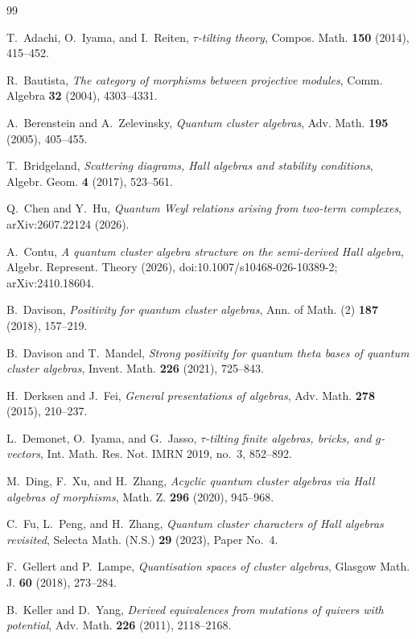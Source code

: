 \begin{thebibliography}{99}

T.~Adachi, O.~Iyama, and I.~Reiten,
\emph{$\tau$-tilting theory},
Compos. Math. \textbf{150} (2014), 415--452.

R.~Bautista,
\emph{The category of morphisms between projective modules},
Comm. Algebra \textbf{32} (2004), 4303--4331.

A.~Berenstein and A.~Zelevinsky,
\emph{Quantum cluster algebras},
Adv. Math. \textbf{195} (2005), 405--455.

T.~Bridgeland,
\emph{Scattering diagrams, Hall algebras and stability conditions},
Algebr. Geom. \textbf{4} (2017), 523--561.

Q.~Chen and Y.~Hu,
\emph{Quantum Weyl relations arising from two-term complexes},
arXiv:2607.22124 (2026).

A.~Contu,
\emph{A quantum cluster algebra structure on the semi-derived Hall algebra},
Algebr. Represent. Theory (2026),
doi:10.1007/s10468-026-10389-2; arXiv:2410.18604.

B.~Davison,
\emph{Positivity for quantum cluster algebras},
Ann. of Math. (2) \textbf{187} (2018), 157--219.

B.~Davison and T.~Mandel,
\emph{Strong positivity for quantum theta bases of quantum cluster algebras},
Invent. Math. \textbf{226} (2021), 725--843.

H.~Derksen and J.~Fei,
\emph{General presentations of algebras},
Adv. Math. \textbf{278} (2015), 210--237.

L.~Demonet, O.~Iyama, and G.~Jasso,
\emph{$\tau$-tilting finite algebras, bricks, and $g$-vectors},
Int. Math. Res. Not. IMRN 2019, no.~3, 852--892.

M.~Ding, F.~Xu, and H.~Zhang,
\emph{Acyclic quantum cluster algebras via Hall algebras of morphisms},
Math. Z. \textbf{296} (2020), 945--968.

C.~Fu, L.~Peng, and H.~Zhang,
\emph{Quantum cluster characters of Hall algebras revisited},
Selecta Math. (N.S.) \textbf{29} (2023), Paper No.~4.

F.~Gellert and P.~Lampe,
\emph{Quantisation spaces of cluster algebras},
Glasgow Math. J. \textbf{60} (2018), 273--284.

B.~Keller and D.~Yang,
\emph{Derived equivalences from mutations of quivers with potential},
Adv. Math. \textbf{226} (2011), 2118--2168.


\end{thebibliography}
